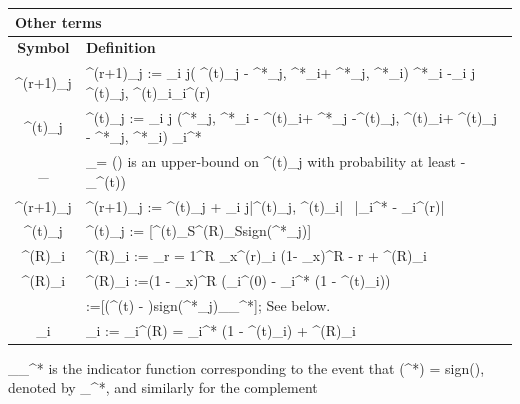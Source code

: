 \documentclass{article}
\newcommand{\sgn}{{\rm sign}}
\def\[#1\]{{$#1$}}
\def\b#1{{\mathbf{#1}}}
\begin{document}
\begin{table}[!b]
\begin{minipage}{\textwidth}
{\begin{threeparttable}[h]
\begin{tabular}{c|l|l}
 		\multicolumn{3}{l}{\textbf{Other terms}}\\ \hline
 		 \textbf{Symbol} &\multicolumn{2}{l}{\textbf{Definition}} \\ \hline
 	    \[\xi^{(r+1)}_j\] & \multicolumn{2}{l}{\[\xi^{(r+1)}_{j}  := \textstyle\sum\limits_{i \neq j}( \langle \b{A}^{(t)}_j - \b{A}^{*}_j, \b{A}^*_i\rangle +  \langle \b{A}^{*}_j, \b{A}^*_i\rangle) \b{x}^*_i -\textstyle\sum\limits_{i \neq j} \langle \b{A}^{(t)}_j, \b{A}^{(t)}_i\rangle \b{x}_i^{(r)}\]} \\\hline
 	    \[\beta^{(t)}_j\] & \multicolumn{2}{l}{\[\beta^{(t)}_j := \textstyle\sum\limits_{i \neq j} (\langle \b{A}^{*}_j,  \b{A}^*_i - \b{A}^{(t)}_i\rangle  + \langle \b{A}^*_j -\b{A}^{(t)}_j, \b{A}^{(t)}_i\rangle + \langle \b{A}^{(t)}_j - \b{A}^{*}_j, \b{A}^*_i\rangle) \b{x}_i^*\] }\\ \hline
 	    \[t_\beta \]& \multicolumn{2}{l}{\[t_\beta = \mathcal{O}(\sqrt{k\epsilon_t})\] is an upper-bound on \[\beta^{(t)}_j\]  with probability  at least \[(1 -	\delta_{\beta}^{(t)})\]} \\ \hline
 	    \[\tilde{\xi}^{(r+1)}_{j}\]  & \multicolumn{2}{l}{\[	\tilde{\xi}^{(r+1)}_{j}  := \beta^{(t)}_j + \textstyle\sum\limits_{i \neq j}|\langle \b{A}^{(t)}_j, \b{A}^{(t)}_i\rangle| ~|\b{x}_i^{*} - \b{x}_i^{(r)}|\]} \\ \hline
	    \[\Delta^{(t)}_j \] & \multicolumn{2}{l}{\[\Delta^{(t)}_j := \b{E}[\b{A}^{(t)}_S\vartheta^{(R)}_S\sgn(\b{x}^*_j)]\]} \\ \hline
 	    \[\vartheta^{(R)}_{i}\] & \multicolumn{2}{l}{\[\vartheta^{(R)}_{i} :=  \textstyle\sum\limits_{r = 1}^{R }\eta_{x}\xi^{(r)}_{i} (1- \eta_x)^{{R} - r} + \gamma^{(R)}_{i}\]} \\ \hline
 	    \[\gamma^{(R)}_{i}\] & \multicolumn{2}{l}{\[\gamma^{(R)}_{i} :=(1 - \eta_{x})^{R} (\b{x}_{i}^{(0)}  - \b{x}_{i}^* (1 - \lambda^{(t)}_{i}))\]} \\ \hline
 	    \[\gamma\] & \multicolumn{2}{l}{\[\gamma:=\mathbf{E}[(\b{A}^{(t)}\hat{\b{x}} - \b{y})\sgn(\b{x}^*_j)\mathbbm{1}_{\overline{\mathcal{F}}_{\b{x}^*}}]\]; See \[\dagger\] below.} \\ \hline
 	    \[\hat{\b{x}}_{i}\] & \multicolumn{2}{l}{\[\hat{\b{x}}_{i} :=	\b{x}_{i}^{(R)} =  \b{x}_{i}^* (1 - \lambda^{(t)}_{i}) + \vartheta^{(R)}_{i}\]}\\ \hline
 	\end{tabular}
 	\begin{tablenotes}
 	\item[$\dagger$] \[\mathbbm{1}_{_{\b{x}^*}}\] is the indicator function corresponding to the event that \[\sgn(\b{x}^*) = \sgn(\hat{\b{x}})\], denoted by \[\mathcal{F}_{\b{x}^*}\], and similarly for the complement \[\overline{\mathcal{F}_{\b{x}^*}}\]
 	\end{tablenotes}
 	\end{threeparttable}}
 	\end{minipage}
 \end{table}
\end{document}
